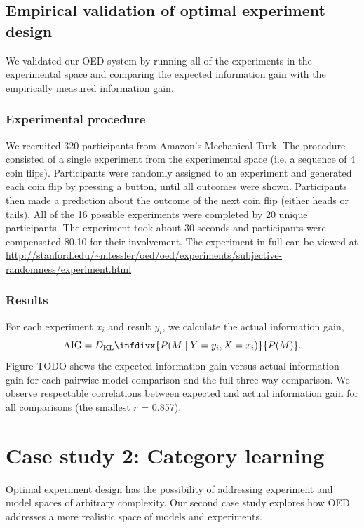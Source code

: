 \documentclass{article}
\newcommand{\dkl}{D_\mathrm{KL}\infdivx}
\begin{document}
\subsection{Empirical validation of optimal experiment design}
We validated our OED system by running all of the experiments in the experimental space and comparing the expected information gain with the empirically measured information gain.

\subsubsection{Experimental procedure}

We recruited 320 participants from Amazon's Mechanical Turk. The procedure consisted of a single experiment from the experimental space (i.e. a sequence of 4 coin flips). Participants were randomly assigned to an experiment and generated each coin flip by pressing a button, until all outcomes were shown. Participants then made a prediction about the outcome of the next coin flip (either heads or tails). All of the 16 possible experiments were completed by 20 unique participants. The experiment took about 30 seconds and participants were compensated \$0.10 for their involvement. The experiment in full can be viewed at \url{http://stanford.edu/~mtessler/oed/oed/experiments/subjective-randomness/experiment.html}

\subsubsection{Results}

For each experiment $x_i$ and result $y_i$, we calculate the actual information gain,
$$\mathrm{AIG} = \dkl{P(M \mid Y = y_i, X = x_i)}{P(M)}.$$
Figure TODO shows the expected information gain versus actual information gain for each pairwise model comparison and the full three-way comparison.
We observe respectable correlations between expected and actual information gain for all comparisons (the smallest $r$ = 0.857).

\section{Case study 2: Category learning}

Optimal experiment design has the possibility of addressing experiment and model spaces of arbitrary complexity. Our second case study explores how OED addresses a more realistic space of models and experiments.
\end{document}
